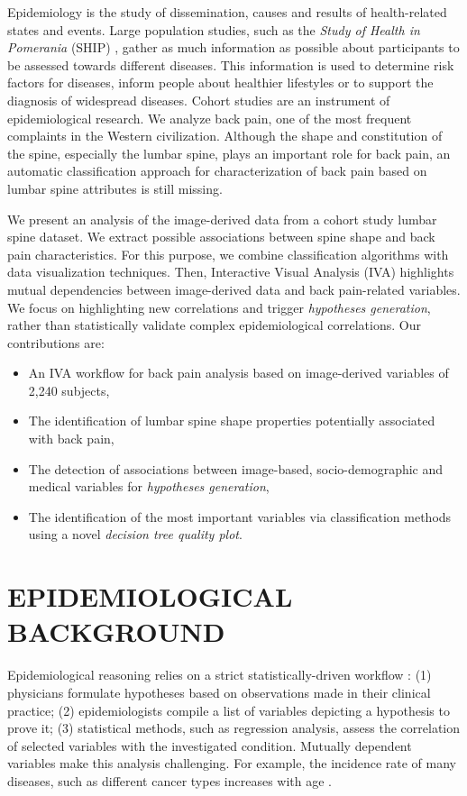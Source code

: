 \documentclass[a4paper,twoside]{style/article}
\begin{document}
\noindent Epidemiology is the study of dissemination, causes and results of health-related states and events.
Large population studies, such as the \emph{Study of Health in Pomerania} (SHIP) \cite{SHIP}, gather as much information as possible about participants to be assessed towards different diseases.
This information is used to determine risk factors for diseases, inform people about healthier lifestyles or to support the diagnosis of widespread diseases.
Cohort studies are an instrument of epidemiological research.
We analyze back pain, one of the most frequent complaints in the Western civilization.
Although the shape and constitution of the spine, especially the lumbar spine, plays an important role for back pain, an automatic classification approach for characterization of back pain based on lumbar spine attributes is still missing.

We present an analysis of the image-derived data from a cohort study lumbar spine dataset.
We extract possible associations between spine shape and back pain characteristics.
For this purpose, we combine classification algorithms with data visualization techniques.
Then, Interactive Visual Analysis (IVA) highlights mutual dependencies between image-derived data and back pain-related variables.
We focus on highlighting new correlations and trigger \emph{hypotheses generation}, rather than statistically validate complex epidemiological correlations.
Our contributions are:
\begin{itemize}
\item An IVA workflow for back pain analysis based on image-derived variables of 2,240 subjects,
\item The identification of lumbar spine shape properties potentially associated with back pain,
\item The detection of associations between image-based, socio-demographic and medical variables for \emph{hypotheses generation},
\item The identification of the most important variables via classification methods using a novel \emph{decision tree quality plot}.
\end{itemize}
\section{\uppercase{Epidemiological Background}}
\label{sec:EpidemiologicalBackground}
\noindent Epidemiological reasoning relies on a strict statistically-driven workflow \cite{Fletcher}:
(1) physicians formulate hypotheses based on observations made in their clinical practice; (2) epidemiologists compile a list of variables depicting a hypothesis to prove it; (3) statistical methods, such as regression analysis, assess the correlation of selected variables with the investigated condition.
Mutually dependent variables make this analysis challenging.
For example, the incidence rate of many diseases, such as different cancer types increases with age \cite{Fletcher}.
\end{document}
